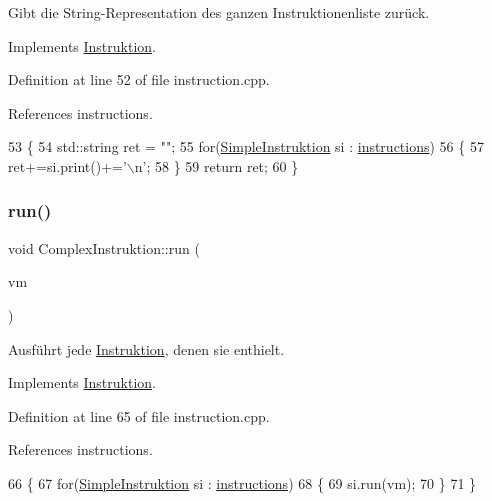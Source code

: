 Gibt die String-\/\+Representation des ganzen Instruktionenliste zurück. 

Implements \mbox{\hyperlink{class_instruktion_a267ff36e98ec889cceccb2f464c36bc6}{Instruktion}}.



Definition at line 52 of file instruction.\+cpp.



References instructions.


\begin{DoxyCode}
53 \{
54     std::string ret = \textcolor{stringliteral}{""};
55     \textcolor{keywordflow}{for}(\mbox{\hyperlink{class_simple_instruktion}{SimpleInstruktion}} si : \mbox{\hyperlink{class_complex_instruktion_af8a7ed862ee24675b75750a470dcf22a}{instructions}})
56     \{
57         ret+=si.print()+=\textcolor{charliteral}{'\(\backslash\)n'};
58     \}
59     \textcolor{keywordflow}{return} ret;
60 \}
\end{DoxyCode}
\mbox{\label{class_complex_instruktion_ab9e037eda3cf53252902f15541a01a21}} 
\subsubsection{\texorpdfstring{run()}{run()}}
{\footnotesize\ttfamily void Complex\+Instruktion\+::run (\begin{DoxyParamCaption}\item[{\mbox{\hyperlink{class_virtual_machine}{Virtual\+Machine}} \&}]{vm }\end{DoxyParamCaption})\hspace{0.3cm}{\ttfamily [virtual]}}

Ausführt jede \mbox{\hyperlink{class_instruktion}{Instruktion}}, denen sie enthielt. 

Implements \mbox{\hyperlink{class_instruktion_ad701f6b5537e5aa8c8c08b81a8946f63}{Instruktion}}.



Definition at line 65 of file instruction.\+cpp.



References instructions.


\begin{DoxyCode}
66 \{
67     \textcolor{keywordflow}{for}(\mbox{\hyperlink{class_simple_instruktion}{SimpleInstruktion}} si : \mbox{\hyperlink{class_complex_instruktion_af8a7ed862ee24675b75750a470dcf22a}{instructions}})
68     \{
69         si.run(vm);
70     \}
71 \}
\end{DoxyCode}


